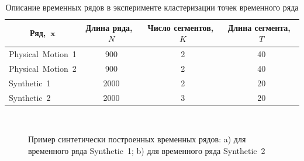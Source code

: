 \documentclass[12pt, twoside]{article}
\numberwithin{equation}{section}
\begin{document}
\begin{table}[h!t]
\begin{center}
\caption{Описание временных рядов в эксперименте кластеризации точек временного ряда}
\label{table_1}
\begin{tabular}{|c|c|c|c|}
\hline
	Ряд,~$\textbf{x}$ &Длина ряда,~$N$& Число сегментов,~$K$&Длина сегмента,~$T$\\
	\hline
	\multicolumn{1}{|l|}{Physical~Motion~1}
	& 900& 2& 40\\
	\hline
	\multicolumn{1}{|l|}{Physical~Motion~2}
	& 900& 2& 40\\
	\hline
	\multicolumn{1}{|l|}{Synthetic~1}
	& 2000& 2& 20\\
	\hline
	\multicolumn{1}{|l|}{Synthetic~2}
	& 2000& 3& 20\\
\hline

\end{tabular}
\end{center}
\end{table}

\begin{figure}[h!t]\center
{}
\\
\caption{Пример синтетически построенных временных рядов: a) для временного ряда Synthetic~1; b) для временного ряда Synthetic~2}
\label{fig_synthetic_series}
\end{figure}
\end{document}
